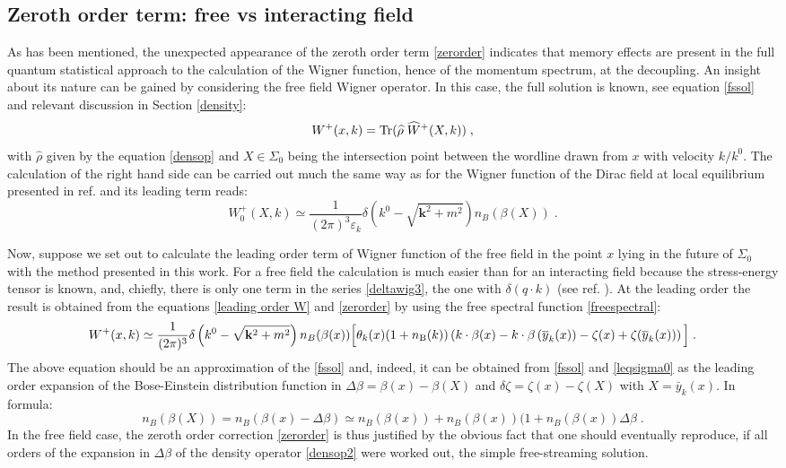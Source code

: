 \documentclass[prd,superscriptaddress,nofootinbib,notitlepage]{revtex4-1}
\def\wrho{{\widehat{\rho}}}
\def\wW{\widehat W}
\newcommand{\Tr}{{\rm Tr}}
\newcommand{\kb}{{\mathbf{k}}}
\newcommand{\be}{\begin{equation}}
\newcommand{\ee}{\end{equation}}
\begin{document}
\subsection{Zeroth order term: free vs interacting field}

As has been mentioned, the unexpected appearance of the zeroth order term \eqref{zerorder} indicates that memory effects are present in the 
full quantum statistical approach to the calculation of the Wigner function, hence of the momentum spectrum, at the decoupling. 
An insight about its nature can be gained by considering the free field Wigner operator. In this case, the full solution is 
known, see equation \eqref{fssol} and relevant discussion in Section \ref{density}:
%
$$
  W^+(x,k) = \Tr (\wrho\; \wW^+(X,k))    \;,      
$$
%
with $\wrho$ given by the equation \eqref{densop} and $X \in \Sigma_0$ being the intersection point between the wordline
drawn from $x$ with velocity $k/k^0$. The calculation of the right hand side can be carried out much the same way as for 
the Wigner function of the Dirac field at local equilibrium presented in ref. \cite{Sheng:2025cjk} and its leading term reads:
%
\be\label{leqsigma0}
   W^+_0(X,k) \simeq \frac{1}{(2\pi)^3\varepsilon_k} \delta\left(k^0-{\sqrt{\kb^2+m^2}}\right) n_B(\beta(X))\;.
\ee
%

Now, suppose we set out to calculate the leading order term of Wigner function of the free field in the point $x$ lying in the 
future of $\Sigma_0$ with the method presented in this work. For a free field the calculation is much easier than for an 
interacting field because the stress-energy tensor is known, and, chiefly, there is only one term in the series \eqref{deltawig3}, the one with $\delta(q\cdot k)$ (see ref. \cite{Sheng:2025cjk}). At the leading order the result is 
obtained from the equations \eqref{leading order W} and \eqref{zerorder} by using the free spectral function \eqref{freespectral}:
%
\begin{equation*}
W^+(x,k) \simeq \frac{1}{(2\pi)^3} \delta\left(k^0-{\sqrt{\kb^2+m^2}}\right) n_B(\beta(x)) \Big[ 
{\theta_k(x)}(1+n_{\rm B}(k))\left( k\cdot\beta(x)-k\cdot\beta\left(\overline{y}_k(x)\right)-
\zeta(x)+\zeta(\overline{y}_k(x))\right) \Big]\;.
\end{equation*}
%
The above equation should be an approximation of the \eqref{fssol} and, indeed, it can be obtained from \eqref{fssol}
and \eqref{leqsigma0} as the leading order expansion of the Bose-Einstein distribution function in 
$\Delta\beta = \beta(x)-\beta(X)$ and $\delta \zeta = \zeta(x)-\zeta(X)$ with $X = \bar y_k(x)$. In formula:
%
$$
 n_B(\beta(X))= n_B\left(\beta(x)-\Delta \beta\right) \simeq n_B(\beta(x)) + n_B(\beta(x))(1+n_B(\beta(x)) \Delta \beta\;.
$$
%
In the free field case, the zeroth order correction \eqref{zerorder} is thus justified by the obvious fact
that one should eventually reproduce, if all orders of the expansion in $\Delta \beta$ of the density operator
\eqref{densop2} were worked out, the simple free-streaming solution. 
\end{document}
